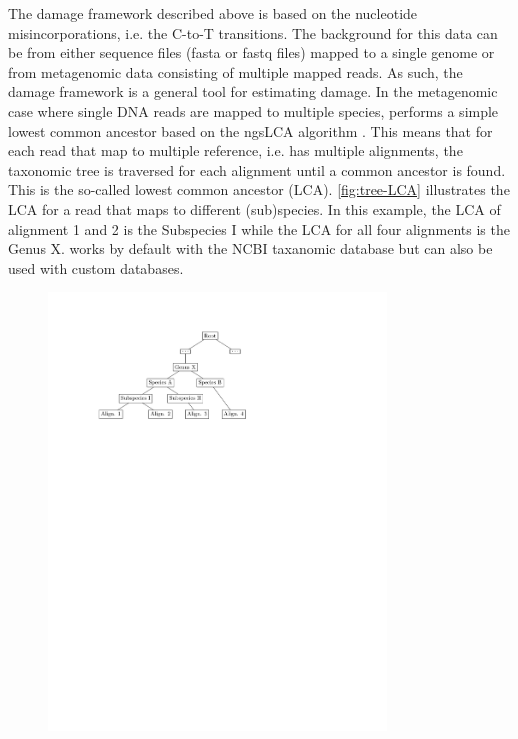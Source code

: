 The damage framework described above is based on the nucleotide misincorporations, i.e. the C-to-T transitions. The background for this data can be from either sequence files (fasta or fastq files) mapped to a single genome or from metagenomic data consisting of multiple mapped reads. As such, the damage framework is a general tool for estimating damage.
In the metagenomic case where single DNA reads are mapped to multiple species, \metaDMG performs a simple lowest common ancestor based on the ngsLCA algorithm \autocite{wangNgsLCAToolkitFasta}. This means that for each read that map to multiple reference, i.e. has multiple alignments, the taxonomic tree is traversed for each alignment until a common ancestor is found. This is the so-called lowest common ancestor (LCA). \autoref{fig:tree-LCA} illustrates the LCA for a read that maps to different (sub)species. In this example, the LCA of alignment 1 and 2 is the Subspecies I while the LCA for all four alignments is the Genus X. \metaDMG works by default with the NCBI taxanomic database but can also be used with custom databases.

\begin{figure}[htbp]
    \centering
    \includegraphics[trim={3cm 19.5cm 8.5cm 2.3cm}, clip,width=0.8\textwidth]{figures/tree.pdf}
\end{figure}

